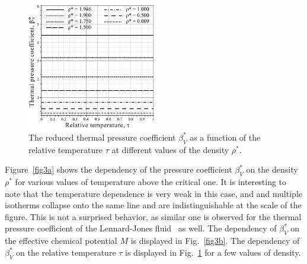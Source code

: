 \begin{figure}[h!]
	\centering \includegraphics[width=0.5\textwidth]{f3c.pdf}
	\vskip-3mm\caption{The reduced thermal pressure coefficient $\beta^*_V$ as a function of the relative temperature $\tau$ at different values of the density $\rho^*$. 
	}\label{fig3c}
\end{figure}

Figure~\ref{fig3a} shows the dependency of the pressure coefficient $\beta^*_V$ on the density $\rho^*$ for various values of temperature above the critical one. It is interesting to note that the temperature dependence is very weak in this case, and and multiple isotherms collapse onto the same line and are indistinguishable at the scale of the figure. This is not a surprised behavior, as similar one is observed for the thermal pressure coefficient of the Lennard-Jones fluid~\cite{YigzaweSadus2013} as well. The dependency of $\beta^*_V$ on the effective chemical potential $M$ is displayed in Fig.~\ref{fig3b}. The dependency of $\beta^*_V$ on the relative temperature $\tau$ is displayed in Fig.~\ref{fig3c} for a few values of density.

